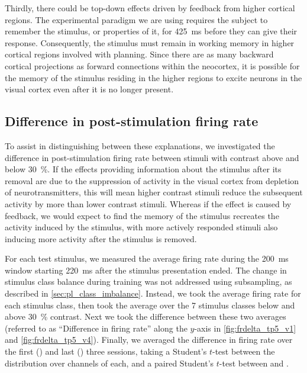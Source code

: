 Thirdly, there could be top-down effects driven by feedback from higher cortical regions.
The experimental paradigm we are using requires the subject to remember the stimulus, or properties of it, for \SI{425}{\milli\second} before they can give their response.
Consequently, the stimulus must remain in working memory in higher cortical regions involved with planning.
Since there are as many backward cortical projections as forward connections within the neocortex, it is possible for the memory of the stimulus residing in the higher regions to excite neurons in the visual cortex even after it is no longer present.


\subsection{Difference in post-stimulation firing rate}

To assist in distinguishing between these explanations, we investigated the difference in post-stimulation firing rate between stimuli with contrast above and below \SI{30}{\percent}.
If the effects providing information about the stimulus after its removal are due to the suppression of activity in the visual cortex from depletion of neurotransmitters, this will mean higher contrast stimuli reduce the subsequent activity by more than lower contrast stimuli.
Whereas if the effect is caused by feedback, we would expect to find the memory of the stimulus recreates the activity induced by the stimulus, with more actively responded stimuli also inducing more activity after the stimulus is removed.

For each test stimulus, we measured the average firing rate during the \SI{200}{\milli\second} window starting \SI{220}{\milli\second} after the stimulus presentation ended.
The change in stimulus class balance during training was not addressed using subsampling, as described in \autoref{sec:pl_class_imbalance}.
Instead, we took the average firing rate for each stimulus class, then took the average over the \num{7} stimulus classes below and above \SI{30}{\percent} contrast.
Next we took the difference between these two averages (referred to as ``Difference in firing rate'' along the $y$-axis in \autoref{fig:frdelta_tp5_v1} and \autoref{fig:frdelta_tp5_v4}).
Finally, we averaged the difference in firing rate over the first () and last () three sessions, taking a Student's $t$-test between the distribution over channels of each, and a paired Student's $t$-test between  and .

